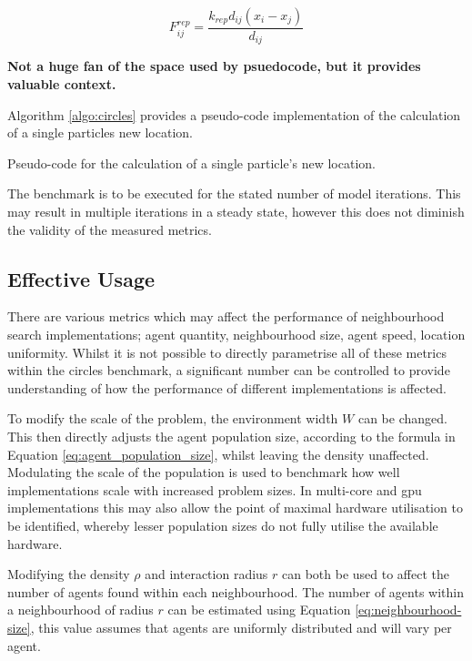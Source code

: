      \begin{equation}\label{eq:timestep-repulsion}
        F_{ij}^{rep} = \frac{k_{rep}d_{ij}(x_{i} - x_{j})} {d_{ij}}
      \end{equation}
      
      \textbf{Not a huge fan of the space used by psuedocode, but it provides valuable context.}
      
      Algorithm \ref{algo:circles} provides a pseudo-code implementation of the calculation of a single particles new location.
\begin{algorithm}

\caption{\label{algo:circles}Pseudo-code for the calculation of a single particle's new location.}
\end{algorithm}
      The benchmark is to be executed for the stated number of model iterations. This may result in multiple iterations in a steady state, however this does not diminish the validity of the measured metrics.
    
  \subsection{Effective Usage}
    There are various metrics which may affect the performance of neighbourhood search implementations; agent quantity, neighbourhood size, agent speed, location uniformity. Whilst it is not possible to directly parametrise all of these metrics within the circles benchmark, a significant number can be controlled to provide understanding of how the performance of different implementations is affected.
    
    To modify the scale of the problem, the environment width $W$ can be changed. This then directly adjusts the agent population size, according to the formula in Equation \ref{eq:agent_population_size}, whilst leaving the density unaffected. Modulating the scale of the population is used to benchmark how well implementations scale with increased problem sizes. In multi-core and \gls{gpu} implementations this may also allow the point of maximal hardware utilisation to be identified, whereby lesser population sizes do not fully utilise the available hardware.
    
    Modifying the density $\rho$ and interaction radius $r$ can both be used to affect the number of agents found within each neighbourhood. The number of agents within a neighbourhood of radius $r$ can be estimated using Equation \ref{eq:neighbourhood-size}, this value assumes that agents are uniformly distributed and will vary per agent.
    
